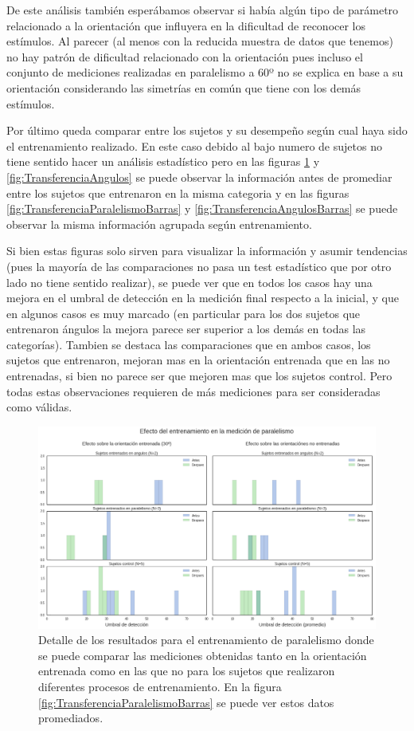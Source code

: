 \documentclass{article}
\begin{document}
    De este análisis también esperábamos observar si había algún tipo de parámetro relacionado a la orientación que influyera en la dificultad de reconocer los estímulos. Al parecer (al menos con la reducida muestra de datos que tenemos) no hay patrón de dificultad relacionado con la orientación pues incluso el conjunto de mediciones realizadas en paralelismo a 60º  no se explica en base a su orientación considerando las simetrías en común que tiene con los demás estímulos.
    
    Por último queda comparar entre los sujetos y su desempeño según cual haya sido el entrenamiento realizado. En este caso debido al bajo numero de sujetos no tiene sentido hacer un análisis estadístico pero en las figuras \ref{fig:TransferenciaParalelismo} y \ref{fig:TransferenciaAngulos} se puede observar la información antes de promediar entre los sujetos que entrenaron en la misma categoria y en las figuras \ref{fig:TransferenciaParalelismoBarras} y \ref{fig:TransferenciaAngulosBarras} se puede observar la misma información agrupada según entrenamiento. 
    
    Si bien estas figuras solo sirven para visualizar la información y asumir tendencias (pues la mayoría de las comparaciones no pasa un test estadístico que por otro lado no tiene sentido realizar), se puede ver que en todos los casos hay una mejora en el umbral de detección en la medición final respecto a la inicial, y que en algunos casos es muy marcado (en particular para los dos sujetos que entrenaron ángulos la mejora parece ser superior a los demás en todas las categorías). Tambien se destaca las comparaciones que en ambos casos, los sujetos que entrenaron, mejoran mas en la orientación entrenada que en las no entrenadas, si bien no parece ser que mejoren mas que los sujetos control. Pero todas estas observaciones requieren de más mediciones para ser consideradas como válidas.
    
    \begin{figure}
        \center
        \includegraphics[width=\textwidth]{Imagenes/TransferenciaParalelismo.png}
        \caption{Detalle de los resultados para el entrenamiento de paralelismo donde se puede comparar las mediciones obtenidas tanto en la orientación entrenada como en las que no para los sujetos que realizaron diferentes procesos de entrenamiento. En la figura \ref{fig:TransferenciaParalelismoBarras} se puede ver estos datos promediados.}
        \label{fig:TransferenciaParalelismo}
    \end{figure}  
\end{document}
